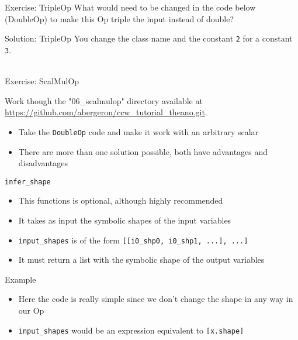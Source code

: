 \documentclass[utf8x]{beamer}
\newcommand{\code}[1]{\lstinline[emph={[2]}]|#1|}
\begin{document}
\begin{frame}{Exercise: TripleOp}
What would need to be changed in the code below (DoubleOp) to make this Op triple the input instead of double?

\end{frame}

\begin{frame}{Solution: TripleOp}
You change the class name and the constant \code{2} for a constant \code{3}. \\
\ 

\end{frame}

\begin{frame}{Exercise: ScalMulOp}
\begin{center}
Work though the "06\_scalmulop" directory available at \url{https://github.com/abergeron/ccw_tutorial_theano.git}.
\end{center}
\begin{itemize}
\item Take the \code{DoubleOp} code and make it work with an arbitrary scalar
\item There are more than one solution possible, both have advantages and disadvantages
\end{itemize}
\end{frame}

\begin{frame}{\code{infer_shape}}

\begin{itemize}
\item This functions is optional, although highly recommended
\item It takes as input the symbolic shapes of the input variables
\item \code{input_shapes} is of the form \code{[[i0_shp0, i0_shp1, ...], ...]}
\item It must return a list with the symbolic shape of the output variables
\end{itemize}
\end{frame}

\begin{frame}{Example}

\begin{itemize}
\item Here the code is really simple since we don't change the shape in any way in our Op
\item \code{input_shapes} would be an expression equivalent to \code{[x.shape]}
\end{itemize}
\end{frame}
\end{document}
